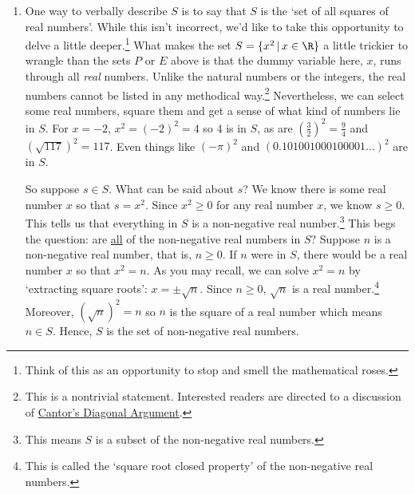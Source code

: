 \begin{ex}
\begin{enumerate}
\smallskip

Proceeding in the same way, we generate elements in $E = \{ 2n \, | \, n \in \mathbb Z \}$ by plugging in integer values of $n$ into the formula $2n$.  Starting with $n = 0$ we obtain $2(0) = 0$.  For $n = 1$ we get $2(1) = 2$, for $n = -1$ we get $2(-1) = -2$ for $n = 2$, we get $2(2) = 4$ and for $n = -2$ we get $2(-2) = -4$.  As $n$  moves through the integers, $2n$ produces all of the \textit{even} integers.\footnote{This shouldn't be too surprising, since an even integer is \textit{defined} to be an integer multiple of $2$.} A roster description for  $E$ is $E = \{ 0, \pm 2, \pm 4, \ldots \}$.

\item  One way to verbally describe $S$ is to say that $S$ is the `set of all squares of real numbers'.  While this isn't incorrect, we'd like to take this opportunity to delve a little deeper.\footnote{Think of this as an opportunity to stop and smell the mathematical roses.}  What makes the set $S = \{ x^2 \, | \, x \in \R \}$ a little trickier to wrangle than the sets $P$ or $E$ above is that the dummy variable here, $x$, runs through all \textit{real} numbers.  Unlike the natural numbers or the integers, the real numbers cannot be listed in any methodical way.\footnote{This is a nontrivial statement.  Interested readers are directed to a discussion of \href{http://en.wikipedia.org/wiki/Cantor's_diagonal_argument}{\underline{Cantor's Diagonal Argument}}.}  Nevertheless, we can select some real numbers, square them and get a sense of what kind of numbers lie in $S$.  For $x = -2$, $x^2 = (-2)^2 = 4$ so $4$ is in $S$, as are $\left(\frac{3}{2}\right)^2 = \frac{9}{4}$ and $(\sqrt{117})^2 = 117$.  Even things like $(-\pi)^2$ and $(0.101001000100001 \ldots)^2$ are in $S$.  

\smallskip

So suppose $s \in S$.  What can be said about $s$?  We know there is some real number $x$ so that $s = x^2$.  Since $x^2 \geq 0$ for any real number $x$, we know $s \geq 0$.  This tells us that everything in $S$ is a non-negative real number.\footnote{This means $S$ is a subset of the non-negative real numbers.}  This begs the question:  are \underline{all} of the non-negative real numbers in $S$?  Suppose $n$ is a non-negative real number, that is, $n \geq 0$.  If $n$ were in $S$, there would be a real number $x$ so that $x^2=n$.  As you may recall, we can solve $x^2 = n$ by `extracting square roots':  $x = \pm \sqrt{n}$.  Since $n \geq 0$, $\sqrt{n}$ is a real number.\footnote{This is called the `square root closed property' of the non-negative real numbers.}  Moreover, $(\sqrt{n})^2 = n$ so $n$ is the square of a real number which means $n \in S$. Hence, $S$ is the set of non-negative real numbers.


\end{enumerate}
\end{ex}
